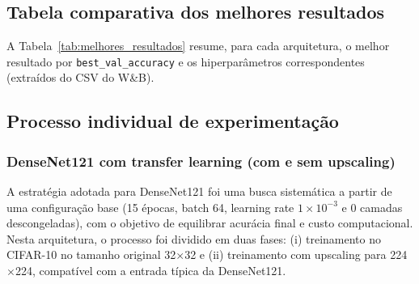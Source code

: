 \documentclass[12pt,a4paper]{article}
\begin{document}
\subsection{Tabela comparativa dos melhores resultados}
A Tabela~\ref{tab:melhores_resultados} resume, para cada arquitetura, o melhor resultado por \texttt{best\_val\_accuracy} e os hiperparâmetros correspondentes (extraídos do CSV do W\&B).

\begin{table}[H]
\centering
\caption{Resumo dos melhores resultados por arquitetura (critério: \texttt{best\_val\_accuracy}; apenas runs \texttt{finished}).}
\label{tab:melhores_resultados}

\setlength{\tabcolsep}{3pt}
\small
{}
\end{table}

\subsection{Processo individual de experimentação}

\subsubsection{DenseNet121 com transfer learning (com e sem upscaling)}
A estratégia adotada para DenseNet121 foi uma busca sistemática a partir de uma configuração base (15 épocas, batch 64, learning rate $1 \times 10^{-3}$ e 0 camadas descongeladas), com o objetivo de equilibrar acurácia final e custo computacional.
Nesta arquitetura, o processo foi dividido em duas fases: (i) treinamento no CIFAR-10 no tamanho original 32$\times$32 e (ii) treinamento com upscaling para 224$\times$224, compatível com a entrada típica da DenseNet121.
\end{document}
